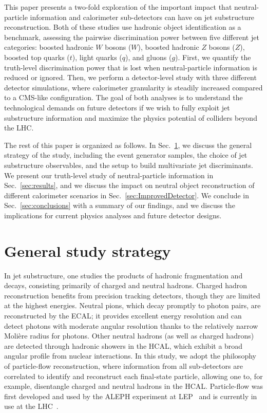 \documentclass[11pt,letterpaper]{article}
\DeclareRobustCommand{\Sec}[1]{Sec.~\ref{#1}}
\begin{document}
This paper presents a two-fold exploration of the important impact that neutral-particle information and calorimeter sub-detectors can have on jet substructure reconstruction.
%
Both of these studies use hadronic object identification as a benchmark, assessing the pairwise discrimination power between five different jet categories:  boosted hadronic $W$ bosons ($W$), boosted hadronic $Z$ bosons ($Z$), boosted top quarks ($t$), light quarks ($q$), and gluons ($g$).
%
First, we quantify the truth-level discrimination power that is lost when neutral-particle information is reduced or ignored.
%
Then, we perform a detector-level study with three different detector simulations, where calorimeter granularity is steadily increased compared to a CMS-like configuration.
%
The goal of both analyses is to understand the technological demands on future detectors if we wish to fully exploit jet substructure information and maximize the physics potential of colliders beyond the LHC.

The rest of this paper is organized as follows.
%
In \Sec{sec:setup}, we discuss the general strategy of the study, including the event generator samples, the choice of jet substructure observables, and the setup to build multivariate jet discriminants.
%
We present our truth-level study of neutral-particle information in \Sec{sec:results}, and we discuss the impact on neutral object reconstruction of different calorimeter scenarios in \Sec{sec:ImprovedDetector}.
%
We conclude in \Sec{sec:conclusions} with a summary of our findings, and we discuss the implications for current physics analyses and future detector designs.

\section{General study strategy}
\label{sec:setup}

In jet substructure, one studies the products of hadronic fragmentation and decays, consisting primarily of charged and neutral hadrons.
%
Charged hadron reconstruction benefits from precision tracking detectors, though they are limited at the highest energies. 
%
Neutral pions, which decay promptly to photon pairs, are reconstructed by the ECAL;  it provides excellent energy resolution and can detect photons with moderate angular resolution thanks to the relatively narrow Moli\`{e}re radius for photons.  
%
Other neutral hadrons (as well as charged hadrons) are detected through hadronic showers in the HCAL, which exhibit a broad angular profile from nuclear interactions.
%
In this study, we adopt the philosophy of particle-flow reconstruction, where information from all sub-detectors are correlated to identify and reconstruct each final-state particle, allowing one to, for example, disentangle charged and neutral hadrons in the HCAL.  
%
Particle-flow was first developed and used by the ALEPH experiment at LEP~\cite{Buskulic:1994wz} and is currently in use at the LHC~\cite{Sirunyan:2017ulk,Aaboud:2017aca}.
\end{document}
